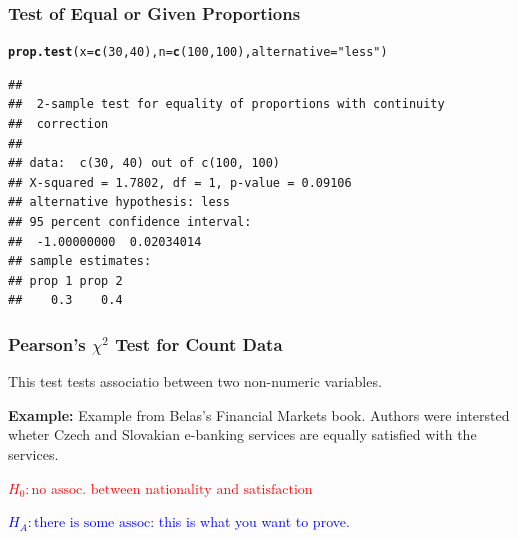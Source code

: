 \documentclass[12pt]{beamer}\usepackage[]{graphicx}\usepackage[]{color}
\makeatletter
\newcommand{\hlnum}[1]{\textcolor[rgb]{0.686,0.059,0.569}{#1}}%
\newcommand{\hlstr}[1]{\textcolor[rgb]{0.192,0.494,0.8}{#1}}%
\newcommand{\hlstd}[1]{\textcolor[rgb]{0.345,0.345,0.345}{#1}}%
\newcommand{\hlkwc}[1]{\textcolor[rgb]{0.333,0.667,0.333}{#1}}%
\newcommand{\hlkwd}[1]{\textcolor[rgb]{0.737,0.353,0.396}{\textbf{#1}}}%
\newenvironment{kframe}{%
 \def\at@end@of@kframe{}%
 \ifinner\ifhmode%
  \def\at@end@of@kframe{\end{minipage}}%
  \begin{minipage}{\columnwidth}%
 \fi\fi%
 \def\FrameCommand##1{\hskip\@totalleftmargin \hskip-\fboxsep
 \colorbox{shadecolor}{##1}\hskip-\fboxsep
     \hskip-\linewidth \hskip-\@totalleftmargin \hskip\columnwidth}%
 \MakeFramed {\advance\hsize-\width
   \@totalleftmargin\z@ \linewidth\hsize
   \@setminipage}}%
 {\par\unskip\endMakeFramed%
 \at@end@of@kframe}
\newenvironment{knitrout}{}{} %
\makeatother
\begin{document}
\begin{frame}[fragile]
\frametitle{Test of Equal or Given Proportions}

\begin{knitrout}\small
{}\color{fgcolor}\begin{kframe}
\begin{alltt}
\hlkwd{prop.test}\hlstd{(}\hlkwc{x}\hlstd{=}\hlkwd{c}\hlstd{(}\hlnum{30}\hlstd{,} \hlnum{40}\hlstd{),} \hlkwc{n}\hlstd{=}\hlkwd{c}\hlstd{(}\hlnum{100}\hlstd{,} \hlnum{100}\hlstd{),} \hlkwc{alternative}\hlstd{=}\hlstr{"less"}\hlstd{)}
\end{alltt}
\begin{verbatim}
## 
## 	2-sample test for equality of proportions with continuity
## 	correction
## 
## data:  c(30, 40) out of c(100, 100)
## X-squared = 1.7802, df = 1, p-value = 0.09106
## alternative hypothesis: less
## 95 percent confidence interval:
##  -1.00000000  0.02034014
## sample estimates:
## prop 1 prop 2 
##    0.3    0.4
\end{verbatim}
\end{kframe}
\end{knitrout}

\end{frame}


\begin{frame}\large
\frametitle{Pearson's $\chi^2$ Test for Count Data}

This test tests associatio between two non-numeric variables.\bigskip

\textbf{Example:} Example from Belas's Financial Markets book. Authors were intersted wheter Czech and Slovakian e-banking services are equally satisfied with the services. \smallskip{}


\textcolor{red}{$H_0: \text{no assoc. between nationality and satisfaction}$} \smallskip

\textcolor{blue}{$H_A: \text{there is some assoc}$: this is what you want to prove.}\bigskip{}

\end{frame}

\end{document}
